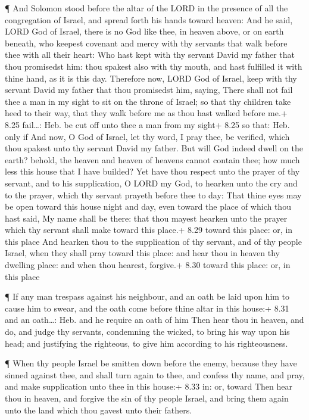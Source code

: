  ¶ And Solomon stood before the altar of the LORD in the
presence of all the congregation of Israel, and spread forth his hands
toward heaven:  And he said, LORD God of Israel, there is
no God like thee, in heaven above, or on earth beneath, who keepest
covenant and mercy with thy servants that walk before thee with all
their heart:  Who hast kept with thy servant David my
father that thou promisedst him: thou spakest also with thy mouth, and
hast fulfilled it with thine hand, as it is this day. 
Therefore now, LORD God of Israel, keep with thy servant David my father
that thou promisedst him, saying, There shall not fail thee a man in my
sight to sit on the throne of Israel; so that thy children take heed to
their way, that they walk before me as thou hast walked before me.+ 8.25
fail\ldots: Heb. be cut off unto thee a man from my sight+ 8.25 so that:
Heb. only if  And now, O God of Israel, let thy word, I
pray thee, be verified, which thou spakest unto thy servant David my
father.  But will God indeed dwell on the earth? behold,
the heaven and heaven of heavens cannot contain thee; how much less this
house that I have builded?  Yet have thou respect unto the
prayer of thy servant, and to his supplication, O LORD my God, to
hearken unto the cry and to the prayer, which thy servant prayeth before
thee to day:  That thine eyes may be open toward this house
night and day, even toward the place of which thou hast said, My name
shall be there: that thou mayest hearken unto the prayer which thy
servant shall make toward this place.+ 8.29 toward this place: or, in
this place  And hearken thou to the supplication of thy
servant, and of thy people Israel, when they shall pray toward this
place: and hear thou in heaven thy dwelling place: and when thou
hearest, forgive.+ 8.30 toward this place: or, in this place

 ¶ If any man trespass against his neighbour, and an oath
be laid upon him to cause him to swear, and the oath come before thine
altar in this house:+ 8.31 and an oath\ldots: Heb. and he require an
oath of him  Then hear thou in heaven, and do, and judge
thy servants, condemning the wicked, to bring his way upon his head; and
justifying the righteous, to give him according to his righteousness.

 ¶ When thy people Israel be smitten down before the enemy,
because they have sinned against thee, and shall turn again to thee, and
confess thy name, and pray, and make supplication unto thee in this
house:+ 8.33 in: or, toward  Then hear thou in heaven, and
forgive the sin of thy people Israel, and bring them again unto the land
which thou gavest unto their fathers.

